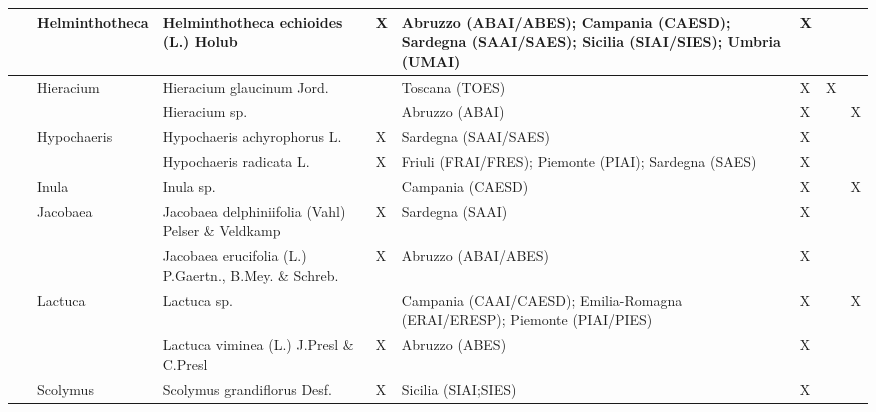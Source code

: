 \documentclass[main.tex]{subfiles}
\begin{document}
        \begin{table}[!ht]
        \centering
    \begin{tabular}[\footnotesize]{|p{2.2cm}|p{2.2cm}|p{2.2cm}|p{1.1cm}|p{1.6cm}|p{0.8cm}|p{1cm}|p{0.8cm}|}
    \hline        
        ~ & Helminthotheca & Helminthotheca echioides (L.) Holub & X & Abruzzo (ABAI/ABES); Campania (CAESD); Sardegna (SAAI/SAES); Sicilia (SIAI/SIES); Umbria (UMAI) & X & ~ & ~ \\ \hline
        ~ & Hieracium & Hieracium glaucinum Jord. & ~ & Toscana (TOES) & X & X & ~ \\ \hline
        ~ & ~ & Hieracium sp. & ~ & Abruzzo (ABAI) & X & ~ & X \\ \hline
        ~ & Hypochaeris & Hypochaeris achyrophorus L. & X & Sardegna (SAAI/SAES) & X & ~ & ~ \\ \hline
        ~ & ~ & Hypochaeris radicata L. & X & Friuli (FRAI/FRES); Piemonte (PIAI); Sardegna (SAES) & X & ~ & ~ \\ \hline
        ~ & Inula & Inula sp. & ~ & Campania (CAESD) & X & ~ & X \\ \hline
        ~ & Jacobaea & Jacobaea delphiniifolia (Vahl) Pelser \& Veldkamp & X & Sardegna (SAAI) & X & ~ & ~ \\ \hline
        ~ & ~ & Jacobaea erucifolia  (L.) P.Gaertn., B.Mey. \& Schreb. & X & Abruzzo (ABAI/ABES) & X & ~ & ~ \\ \hline
        ~ & Lactuca & Lactuca sp. & ~ & Campania (CAAI/CAESD); Emilia-Romagna (ERAI/ERESP); Piemonte (PIAI/PIES) & X & ~ & X \\ \hline
        ~ & ~ & Lactuca viminea (L.) J.Presl \& C.Presl & X & Abruzzo (ABES) & X & ~ & ~ \\ \hline
        ~ & Scolymus & Scolymus grandiflorus Desf. & X & Sicilia (SIAI;SIES) & X & ~ & ~ \\ \hline
            \end{tabular}
    \end{table}
    
    \clearpage
        
\end{document}
